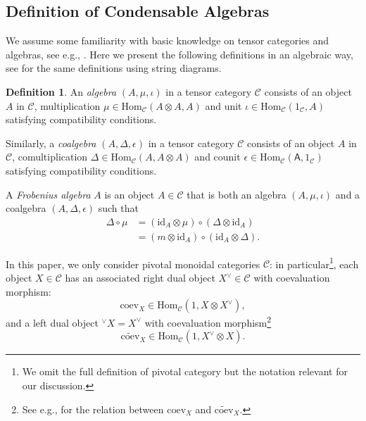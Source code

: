 \documentclass[aps,twocolumn,prx,floatfix,preprintnumbers, nofootinbib,10pt]{revtex4-2}
\numberwithin{equation}{section}
\theoremstyle{definition}
\newtheorem{definition}[theorem]{Definition}
\newcommand{\id}{\text{id}}
\newcommand{\wt}{\widetilde}
\newcommand{\cC}{\mathcal{C}}
\newcommand{\A}{\mathsf{A}}
\newcommand{\Hom}{\text{Hom}}
\newcommand{\eps}{\epsilon}
\begin{document}
\subsection{Definition of Condensable Algebras}
\label{app:defn-cond-alg}
We assume some familiarity with basic knowledge on tensor categories and algebras, see e.g., \cite{Fuchs:2002cm, Frohlich:2003hm, EGNO}. 
Here we present the following definitions in an algebraic way, see \cite{Fuchs:2002cm} for the same definitions using string diagrams.
\begin{definition}
    An \emph{algebra} $(A, \mu, \iota)$ in a tensor category $\cC$ consists of an object $A$ in $\cC$, multiplication $\mu\in \Hom_{\cC} (A\otimes A, A)$ and unit $\iota\in \Hom_{\cC}(1_{\cC}, A)$ satisfying compatibility conditions. 

    Similarly, a \emph{coalgebra} $(A, \Delta, \eps)$ in a tensor category $\cC$ consists of an object $A$ in $\cC$, comultiplication $\Delta \in \Hom_\cC(A, A\otimes A)$ and counit $\eps\in \Hom_{\cC}(\A, 1_\cC)$ satisfying compatibility conditions.

    A \emph{Frobenius algebra} $A$ is an object $A\in \cC$ that is both an algebra $(A, \mu, \iota)$ and a coalgebra $(A, \Delta, \eps)$ such that
    \begin{equation}
        \begin{split}
            \Delta \circ \mu & = (\id_A \otimes \mu) \circ (\Delta \otimes \id_A) \\
            & = (m \otimes \id_A) \circ (\id_A \otimes \Delta).
        \end{split}
    \end{equation}
\end{definition}
In this paper, we only consider pivotal monoidal categories $\cC$: in particular\footnote{We omit the full definition of pivotal category but the notation relevant for our discussion.}, each object $X\in \cC$ has an associated right dual object $X^\vee \in\cC$ with coevaluation morphism:
\begin{equation}
    \text{coev}_X\in \Hom_{\cC}(1, X\otimes X^\vee),
\end{equation}
and a left dual object ${}^\vee \! X=X^\vee$ with coevaluation morphism\footnote{See e.g., \cite{Fuchs:2002cm} for the relation between $\text{coev}_X$ and $\wt{\text{coev}}_X$.}
\begin{equation}
    \wt{\text{coev}}_X \in \Hom_{\cC}(1, X^\vee\otimes X).
\end{equation}
\end{document}
